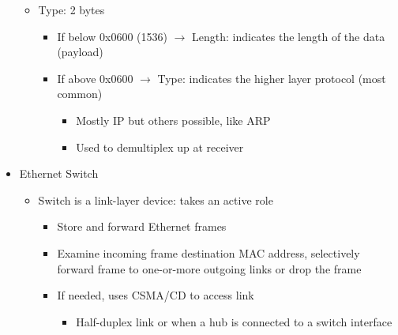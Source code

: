 \begin{itemize}
\begin{itemize}
      \item Type: 2 bytes

        \begin{itemize}

          \item If below 0x0600 (1536) $\to$ Length: indicates the length of the data (payload)

          \item If above 0x0600 $\to$ Type: indicates the higher layer protocol (most common)

            \begin{itemize}

              \item Mostly IP but others possible, like ARP

              \item Used to demultiplex up at receiver

            \end{itemize}

        \end{itemize}

    \end{itemize}

  \item Ethernet Switch

    \begin{itemize}

      \item Switch is a link-layer device: takes an active role

        \begin{itemize}

          \item Store and forward Ethernet frames

          \item Examine incoming frame destination MAC address, selectively forward frame to one-or-more outgoing links or drop the frame

          \item If needed, uses CSMA/CD to access link

            \begin{itemize}

              \item Half-duplex link or when a hub is connected to a switch interface

            \end{itemize}

        \end{itemize}


\end{itemize}
\end{itemize}
